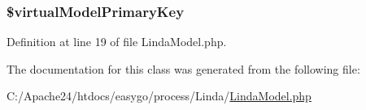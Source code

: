 \hypertarget{class_linda_model_ac155ae9a10f7fe23e69866ef520cc40a}{}
\subsubsection[{\$virtual\+Model\+Primary\+Key}]{\setlength{\rightskip}{0pt plus 5cm}\$virtual\+Model\+Primary\+Key\hspace{0.3cm}{\ttfamily [protected]}}\label{class_linda_model_ac155ae9a10f7fe23e69866ef520cc40a}


Definition at line 19 of file Linda\+Model.\+php.



The documentation for this class was generated from the following file\+:\begin{DoxyCompactItemize}
\item 
C\+:/\+Apache24/htdocs/easygo/process/\+Linda/\hyperlink{_linda_model_8php}{Linda\+Model.\+php}\end{DoxyCompactItemize}
